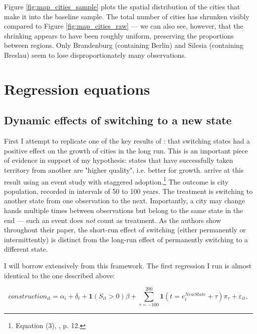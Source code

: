 \documentclass[11pt, a4paper]{article}
\begin{document}
Figure \ref{fig:map_cities_sample} plots the spatial distribution of the cities that make it into the baseline sample. The total number of cities has shrunken visibly compared to Figure \ref{fig:map_cities_raw} --- we can also see, however, that the shrinking appears to have been roughly uniform, preserving the proportions between regions. Only Brandenburg (containing Berlin) and Silesia (containing Breslau) seem to lose disproportionately many observations.


\section{Regression equations} \label{sec:empirics}

\subsection{Dynamic effects of switching to a new state}

First I attempt to replicate one of the key results of \cite{schoenholzer2022}: that switching states had a positive effect on the growth of cities in the long run. This is an important piece of evidence in support of my hypothesis: states that have successfully taken territory from another are "higher quality", i.e. better for growth. \cite{schoenholzer2022} arrive at this result using an event study with staggered adoption.\footnote
{
    Equation (3), \citealp{schoenholzer2022}, p. 12.
}
The outcome is city population, recorded in intervals of 50 to 100 years. The treatment is switching to another state from one observation to the next. Importantly, a city may change hands multiple times between observations but belong to the same state in the end --- such an event does \textit{not} count as treatment. As the authors show throughout their paper, the short-run effect of switching (either permanently or intermittently) is distinct from the long-run effect of permanently switching to a different state.

I will borrow extensively from this framework. The first regression I run is almost identical to the one described above:

\begin{equation}
\label{eq:sw22}
    construction_{it} = \alpha_i + \delta_t + \mathbf{1}(S_{it} > 0)\beta + 
    \sum_{\tau = -100}^{200} \mathbf{1}(t = e^{NewState}_i + \tau)\pi_\tau + \varepsilon_{it},
\end{equation}
\end{document}
